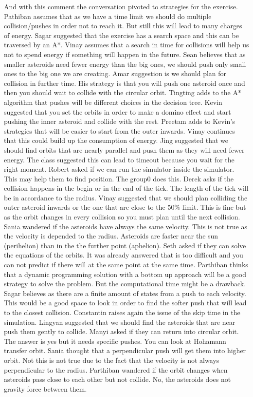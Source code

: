 And with this comment the conversation pivoted to strategies for the exercise. 
Pathiban assumes that as we have a time limit we should do multiple collision/pushes in order not to reach it. But still this will lead to many charges of energy.
Sagar suggested that the exercise has a search space and this can be traversed by an A*.
Vinay assumes that a search in time for collisions will help us not to spend energy if something will happen in the future.
Sean believes that as smaller asteroids need  fewer energy than the big ones, we should push only small ones to the big one we are creating.
Amar suggestion is we should plan for collision in further time. His strategy is that you will push one asteroid once and then you should wait to collide with the circular orbit.
Tingting adds to the A* algorithm that pushes will be different choices in the decision tree.
Kevin suggested that you set the orbits in order to make a domino effect and start pushing the inner asteroid and collide with the rest.
Preetam adds to Kevin’s strategies that will be easier to start from the outer inwards.
Vinay continues that this could build up the consumption of energy.
Jing suggested that we should find orbits that are nearly parallel and push them as they will need fewer energy.
The class suggested this can lead to timeout because you wait for the right moment.
Robert asked if we can run the simulator inside the simulator. This may help them to find position. The group0 does this.
Derek asks if the collision happens in the begin or in the end of the tick. The length of the tick will be in accordance to the radius.
Vinay suggested that we should plan colliding the outer asteroid inwards or the one that are close to the 50\% limit. 
This is fine but as the orbit changes in every collision so you must plan until the next collision.
Sania wandered if the asteroids have always the same velocity. This is not true as the velocity is depended to the radius. Asteroids are faster near the sun (perihelion) than in the the further point (aphelion). 
Seth asked if they can solve the equations of the orbits. It was already answered that is too difficult and you can not predict if there will at the same point at the same time.
Parthiban thinks that a dynamic programming solution with a bottom up approach will be a good strategy to solve the problem. But the computational time might be a drawback.
Sagar believes as there are a finite amount of states from a push to each velocity. This would be a good space to look in order to find the softer push that will lead to the closest collision.
Constantin raises again the issue of the skip time in the simulation.
Lingyan suggested that we should find the asteroids that are near push them gently to collide.
Manyi asked if they can return into circular orbit. The answer is yes but it needs specific pushes. You can look at Hohamann transfer orbit.
Sania thought that a perpendicular push will get them into higher orbit. Not this is not true due to the fact that the velocity is not always perpendicular to the radius.
Parthiban wandered if the orbit changes when asteroids pass close to each other but not collide. 
No, the asteroids does not gravity force between them.
